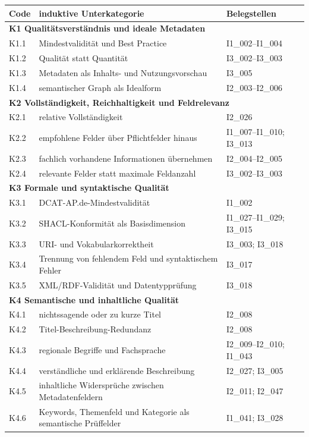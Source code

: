 \begin{table}[H]
\centering
\tiny
\renewcommand{\arraystretch}{0.8}
\label{tab:unterkategorien}

\begin{tabular}{p{1cm} p{8.8cm} p{2.5cm}}
\toprule
\textbf{Code} & \textbf{induktive Unterkategorie} & \textbf{Belegstellen} \\
\midrule

\multicolumn{3}{l}{\textbf{K1 Qualitätsverständnis und ideale Metadaten}} \\
\midrule
K1.1 & Mindestvalidität und Best Practice & I1\_002--I1\_004 \\ \hline
K1.2 & Qualität statt Quantität & I3\_002--I3\_003 \\ \hline
K1.3 & Metadaten als Inhalts- und Nutzungsvorschau & I3\_005 \\ \hline
K1.4 & semantischer Graph als Idealform & I2\_003--I2\_006 \\
\midrule

\multicolumn{3}{l}{\textbf{K2 Vollständigkeit, Reichhaltigkeit und Feldrelevanz}} \\
\midrule
K2.1 & relative Vollständigkeit & I2\_026 \\ \hline
K2.2 & empfohlene Felder über Pflichtfelder hinaus & I1\_007--I1\_010; I3\_013 \\ \hline
K2.3 & fachlich vorhandene Informationen übernehmen & I2\_004--I2\_005 \\ \hline
K2.4 & relevante Felder statt maximale Feldanzahl & I3\_002--I3\_003 \\
\midrule

\multicolumn{3}{l}{\textbf{K3 Formale und syntaktische Qualität}} \\
\midrule
K3.1 & DCAT-AP.de-Mindestvalidität & I1\_002 \\ \hline
K3.2 & SHACL-Konformität als Basisdimension & I1\_027--I1\_029; I3\_015 \\ \hline
K3.3 & URI- und Vokabularkorrektheit & I3\_003; I3\_018 \\ \hline
K3.4 & Trennung von fehlendem Feld und syntaktischem Fehler & I3\_017 \\ \hline
K3.5 & XML/RDF-Validität und Datentypprüfung & I3\_018 \\
\midrule

\multicolumn{3}{l}{\textbf{K4 Semantische und inhaltliche Qualität}} \\
\midrule
K4.1 & nichtssagende oder zu kurze Titel & I2\_008 \\ \hline
K4.2 & Titel-Beschreibung-Redundanz & I2\_008 \\ \hline
K4.3 & regionale Begriffe und Fachsprache & I2\_009--I2\_010; I1\_043 \\ \hline
K4.4 & verständliche und erklärende Beschreibung & I2\_027; I3\_005 \\ \hline
K4.5 & inhaltliche Widersprüche zwischen Metadatenfeldern & I2\_011; I2\_047 \\ \hline
K4.6 & Keywords, Themenfeld und Kategorie als semantische Prüffelder & I1\_041; I3\_028 \\
\midrule


\end{tabular}
\end{table}
